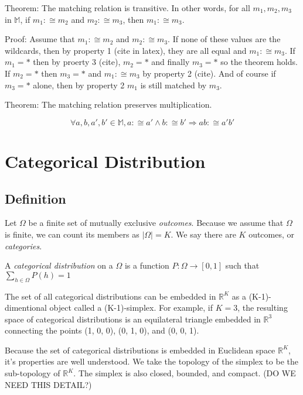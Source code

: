 \documentclass[twoside]{article}
\begin{document}
Theorem: The matching relation is transitive. In other words, for all \(m_1, m_2, m_3\) in \(\mathbb{M}\), if \(m_1 :\cong m_2\) and \(m_2 :\cong m_3\), then \(m_1 :\cong m_3\).

Proof: Assume that \(m_1 :\cong m_2\) and \(m_2 :\cong m_3\). If none of these values are the wildcards, then by property 1 (cite in latex), they are all equal and \(m_1 :\cong m_3\). If \(m_1 = \ast\) then by proerty 3 (cite), \(m_2 = \ast\) and finally \(m_3 = \ast\) so the theorem holds. If \(m_2 = \ast\) then \(m_3 = \ast\) and \(m_1 :\cong m_3\) by property 2 (cite). And of course if \(m_3 = \ast\) alone, then by property 2 \(m_1\) is still matched by \(m_3\).

Theorem: The matching relation preserves multiplication.

\begin{equation}
\label{eq:matching_multiplication}
\forall a,b,a',b' \in \mathbb{M}, a :\cong a' \wedge b :\cong b' \Rightarrow ab :\cong a'b'
\end{equation}

\section{Categorical Distribution}

\subsection{Definition}

Let \(\Omega\) be a finite set of mutually exclusive \textit{outcomes}. Because we assume that \(\Omega\) is finite, we can count its members as \(|\Omega| = K\). We say there are \(K\) outcomes, or \textit{categories}.

A \textit{categorical distribution} on a \(\Omega\) is a function \(P: \Omega \rightarrow [0, 1]\) such that \(\sum_{h \in \Omega} P(h) = 1\)

The set of all categorical distributions can be embedded in \(\mathbb{R}^K\) as a (K-1)-dimentional object called a (K-1)-simplex. For example, if \(K = 3\), the resulting space of categorical distributions is an equilateral triangle embedded in \(\mathbb{R}^3\) connecting the points (1, 0, 0), (0, 1, 0), and (0, 0, 1).

Because the set of categorical distributions is embedded in Euclidean space \(\mathbb{R}^K\), it's properties are well understood. We take the topology of the simplex to be the sub-topology of \(\mathbb{R}^K\). The simplex is also closed, bounded, and compact. (DO WE NEED THIS DETAIL?)
\end{document}
